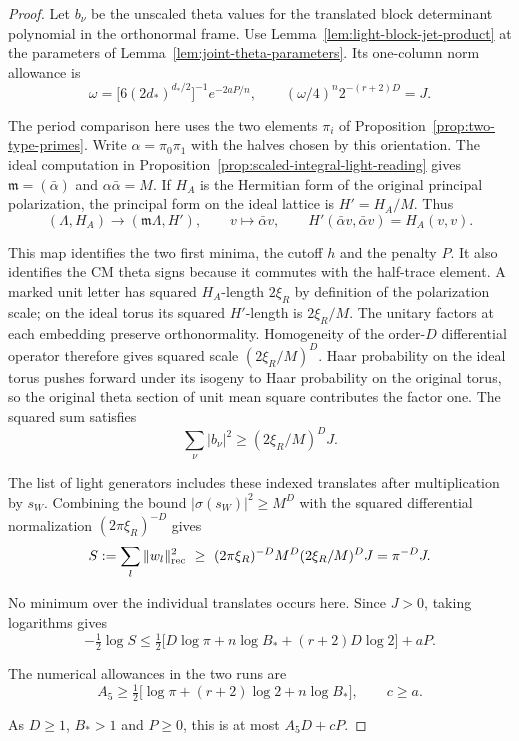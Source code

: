 \begin{proof}
Let \(b_\nu\) be the unscaled theta values for the translated block
determinant polynomial in the orthonormal frame. Use Lemma~\ref{lem:light-block-jet-product} at the parameters of
Lemma~\ref{lem:joint-theta-parameters}. Its one-column norm allowance is
\[
 \omega=\bigl[6(2d_*)^{d_*/2}\bigr]^{-1} e^{-2aP/n},
 \qquad (\omega/4)^n 2^{-(r+2)D}=J .
\]

The period comparison here uses the two elements \(\pi_i\) of
Proposition~\ref{prop:two-type-primes}. Write \(\alpha=\pi_0\pi_1\)
with the halves chosen by this orientation. The ideal computation in
Proposition~\ref{prop:scaled-integral-light-reading} gives
\(\mathfrak m=(\bar\alpha)\) and \(\alpha\bar\alpha=M\).
If \(H_A\) is the Hermitian form of the original principal polarization,
the principal form on the ideal lattice is \(H'=H_A/M\). Thus
\[
 (\Lambda,H_A)\longrightarrow(\mathfrak m\Lambda,H'),\qquad
 v\longmapsto\bar\alpha v,\qquad
 H'(\bar\alpha v,\bar\alpha v)=H_A(v,v).
\]

This map identifies the two first minima, the cutoff \(h\) and the
penalty \(P\). It also identifies the CM theta signs because it
commutes with the half-trace element. A marked unit letter has
squared \(H_A\)-length \(2\xi_R\) by definition of the polarization
scale; on the ideal torus its squared \(H'\)-length is \(2\xi_R/M\).
The unitary factors at each embedding preserve orthonormality.
Homogeneity of the order-\(D\) differential operator therefore
gives squared scale \((2\xi_R/M)^D\). Haar probability on the
ideal torus pushes forward under its isogeny to Haar probability
on the original torus, so the original theta section of unit
mean square contributes the factor one. The squared sum satisfies
\[
                    \sum_\nu |b_\nu|^2\ge (2\xi_R/M)^D J .
\]

The list of light generators includes these indexed translates after
multiplication by \(s_W\). Combining the bound
\(|\sigma(s_W)|^2\ge M^D\) with the squared differential normalization
\((2\pi\xi_R)^{-D}\) gives
\[
 S:=\sum_l\|w_l\|_{\rm rec}^2
 \ \ge\ (2\pi\xi_R)^{-D}M^D(2\xi_R/M)^D J=\pi^{-D}J.
\]

No minimum over the individual translates occurs here. Since \(J>0\),
taking logarithms gives
\[
 -\tfrac12\log S\le
 \tfrac12\big[D\log\pi+n\log B_*+(r+2)D\log2\big]+aP .
\]

The numerical allowances in the two runs are
\[
 A_5\ge\tfrac12\big[\log\pi+(r+2)\log2+n\log B_*\big],
 \qquad c\ge a .
\]

As \(D\ge1\), \(B_*>1\) and \(P\ge0\), this is at most \(A_5D+cP\).


\end{proof}
